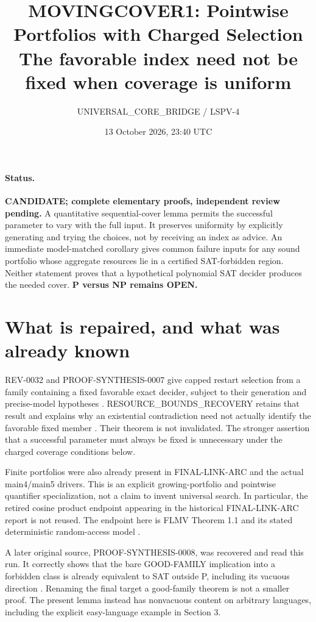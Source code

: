 \documentclass[11pt]{article}
\title{MOVINGCOVER1: Pointwise Portfolios with Charged Selection\\
\large The favorable index need not be fixed when coverage is uniform}
\author{UNIVERSAL\_CORE\_BRIDGE / LSPV-4}
\date{13 October 2026, 23:40 UTC}
\begin{document}
\maketitle
\paragraph{Status.}
\textbf{CANDIDATE; complete elementary proofs, independent review pending.}
A quantitative sequential-cover lemma permits the successful parameter to
vary with the full input. It preserves uniformity by explicitly generating
and trying the choices, not by receiving an index as advice. An immediate
model-matched corollary gives common failure inputs for any sound portfolio
whose aggregate resources lie in a certified SAT-forbidden region. Neither
statement proves that a hypothetical polynomial SAT decider produces the
needed cover. \textbf{P versus NP remains OPEN.}

\section{What is repaired, and what was already known}
REV-0032 and PROOF-SYNTHESIS-0007 give capped restart selection from a family
containing a fixed favorable exact decider, subject to their generation and
precise-model hypotheses \cite{rev,syn7}. RESOURCE\_BOUNDS\_RECOVERY retains
that result and explains why an existential contradiction need not actually
identify the favorable fixed member \cite{recovery}. Their theorem is not
invalidated. The stronger assertion that a successful parameter must always
be fixed is unnecessary under the charged coverage conditions below.

Finite portfolios were also already present in FINAL-LINK-ARC and the actual
main4/main5 drivers. This is an explicit growing-portfolio and pointwise
quantifier specialization, not a claim to invent universal search. In
particular, the retired cosine product endpoint appearing in the historical
FINAL-LINK-ARC report is not reused. The endpoint here is FLMV Theorem 1.1
and its stated deterministic random-access model \cite{flmv}.

A later original source, PROOF-SYNTHESIS-0008, was recovered and read this run.
It correctly shows that the bare GOOD-FAMILY implication into a forbidden
class is already equivalent to SAT outside P, including its vacuous direction
\cite{syn8}. Renaming the final target a good-family theorem is not a smaller
proof. The present lemma instead has nonvacuous content on arbitrary languages,
including the explicit easy-language example in Section 3.
\end{document}
